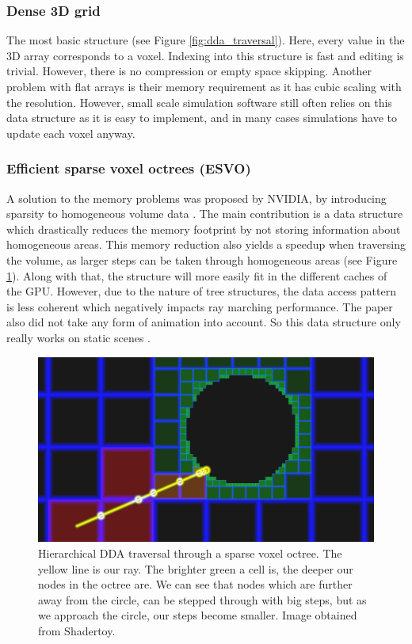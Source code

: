 \subsubsection{Dense 3D grid} \label{introduction:voxel_data_structures:dense_grid}
The most basic structure (see Figure \ref{fig:dda_traversal}). Here, every value in the 3D array corresponds to a voxel. Indexing into this structure is fast and editing is trivial. However, there is no compression or empty space skipping. Another problem with flat arrays is their memory requirement as it has cubic scaling with the resolution. However, small scale simulation software still often relies on this data structure as it is easy to implement, and in many cases simulations have to update each voxel anyway.


\subsubsection{Efficient sparse voxel octrees (ESVO)} \label{introduction:voxel_data_structures:esvo}
A solution to the memory problems was proposed by NVIDIA, by introducing sparsity to homogeneous volume data \cite{laine2010efficient}. The main contribution is a data structure which drastically reduces the memory footprint by not storing information about homogeneous areas. This memory reduction also yields a speedup when traversing the volume, as larger steps can be taken through homogeneous areas (see Figure \ref{fig:esvo}). Along with that, the structure will more easily fit in the different caches of the GPU. However, due to the nature of tree structures, the data access pattern is less coherent which negatively impacts ray marching performance. The paper also did not take any form of animation into account. So this data structure only really works on static scenes \cite{JohnLinPerfectEngine}.

\begin{figure}[H]
    \centering
    \includegraphics[width=0.9\linewidth]{figures/esvo_traversal.png}
    \caption{Hierarchical DDA traversal through a sparse voxel octree. The yellow line is our ray. The brighter green a cell is, the deeper our nodes in the octree are. We can see that nodes which are further away from the circle, can be stepped through with big steps, but as we approach the circle, our steps become smaller. Image obtained from Shadertoy.}
    \label{fig:esvo}
\end{figure}
